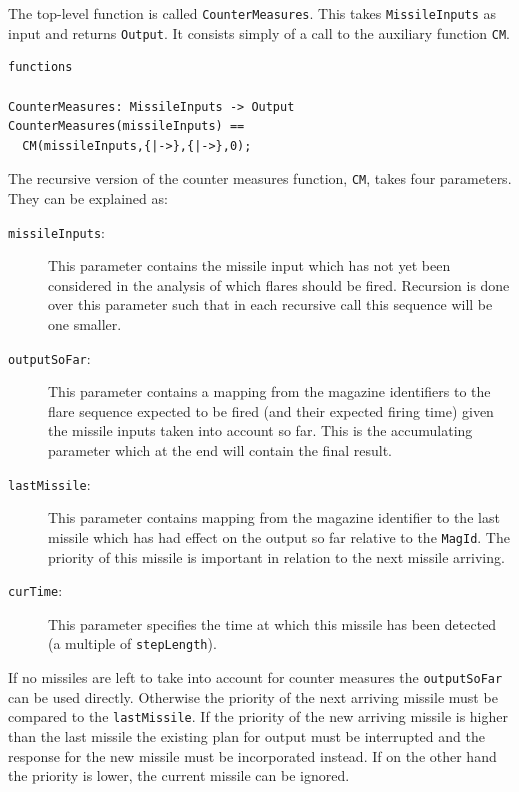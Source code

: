 \documentclass{overturerepchap}
\begin{document}
The top-level function is called \texttt{CounterMeasures}. This takes
\texttt{MissileInputs} as input and returns \texttt{Output}. It
consists simply of a call to the auxiliary function \texttt{CM}.

\begin{lstlisting}
functions

CounterMeasures: MissileInputs -> Output
CounterMeasures(missileInputs) ==
  CM(missileInputs,{|->},{|->},0);
\end{lstlisting}

The recursive version of the counter measures function, \texttt{CM},
takes four parameters. They can be explained as:

\begin{description}
\item[\texttt{missileInputs}:] This parameter contains the missile
input which has not yet been considered in the analysis of which
flares should be fired. Recursion is done over this parameter such
that in each recursive call this sequence will be one smaller.
\item[\texttt{outputSoFar}:] This parameter contains a mapping from the
magazine identifiers to the flare
sequence expected to be fired (and their expected firing time) given
the missile inputs taken into account so far.  This is the
accumulating parameter which at the end will contain the final result.
\item[\texttt{lastMissile}:] This parameter contains mapping from the 
magazine identifier to the last missile
which has had effect on the output so far relative to the \texttt{MagId}. 
The priority of this
missile is important in relation to the next missile arriving.
\item[\texttt{curTime}:] This parameter specifies the time at which 
this missile has
been detected (a multiple of \texttt{stepLength}).
\end{description}

If no missiles are left to take into account for counter measures the
\texttt{outputSoFar} can be used directly. Otherwise the priority of the next
arriving missile must be compared to the \texttt{lastMissile}. If the priority
of the new arriving missile is higher than the last missile the
existing plan for output must be interrupted and the response for the
new missile must be incorporated instead. If on the other hand the
priority is lower, the current missile can be ignored.
\end{document}

